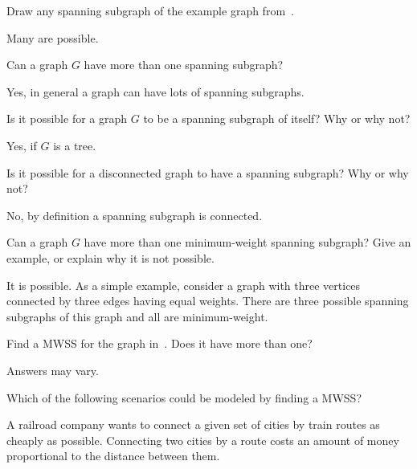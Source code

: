 \documentclass{tufte-handout}
\begin{document}
\begin{questions}
\item \label{q:draw-ss} Draw any spanning subgraph of the example
  graph from~.

  \begin{answer}
    Many are possible.
  \end{answer}
\item Can a graph $G$ have more than one spanning subgraph?

  \begin{answer}
    Yes, in general a graph can have lots of spanning subgraphs.
  \end{answer}
\item Is it possible for a graph $G$ to be a spanning subgraph of
  itself?  Why or why not?

  \begin{answer}
    Yes, if $G$ is a tree.
  \end{answer}
\item Is it possible for a disconnected graph to have a spanning
  subgraph?  Why or why not?

  \begin{answer}
    No, by definition a spanning subgraph is connected.
  \end{answer}
\item Can a graph $G$ have more than one minimum-weight spanning
  subgraph?  Give an example, or explain why it is not possible.

  \begin{answer}
    It is possible.  As a simple example, consider a graph with three
    vertices connected by three edges having equal weights.  There are
    three possible spanning subgraphs of this graph and all are
    minimum-weight.
  \end{answer}
\item Find a MWSS for the graph in~. Does it have
  more than one?

  \begin{answer}
    Answers may vary.
  \end{answer}
\item \label{q:scenarios} Which of the following scenarios could be
  modeled by finding a MWSS?
  \begin{subquestions}
  \item A railroad company wants to connect a given set of cities by
    train routes as cheaply as possible. Connecting two cities by a
    route costs an amount of money proportional to the distance
    between them.


\end{subquestions}
\end{questions}
\end{document}
